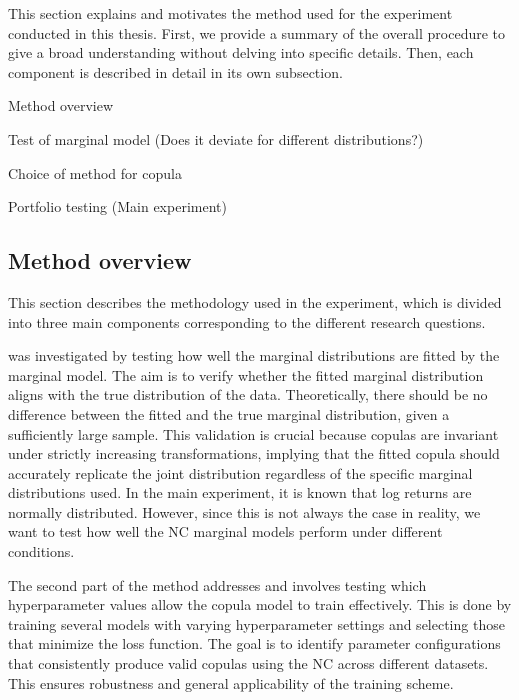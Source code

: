 This section explains and motivates the method used for the experiment conducted in this thesis. First, we provide a summary of the overall procedure to give a broad understanding without delving into specific details. Then, each component is described in detail in its own subsection.

\begin{generalinstructions}
\begin{compactenum}
\item Method overview
\item Test of marginal model (Does it deviate for different distributions?)
\item Choice of method for copula
\item Portfolio testing (Main experiment)
\end{compactenum}
\end{generalinstructions}

\subsection{Method overview}
This section describes the methodology used in the experiment, which is divided into three main components corresponding to the different research questions.

\RQone was investigated by testing how well the marginal distributions are fitted by the marginal model. The aim is to verify whether the fitted marginal distribution aligns with the true distribution of the data. Theoretically, there should be no difference between the fitted and the true marginal distribution, given a sufficiently large sample. This validation is crucial because copulas are invariant under strictly increasing transformations, implying that the fitted copula should accurately replicate the joint distribution regardless of the specific marginal distributions used. In the main experiment, it is known that log returns are normally distributed. However, since this is not always the case in reality, we want to test how well the \gls{NC} marginal models perform under different conditions.

The second part of the method addresses \RQtwo and involves testing which hyperparameter values allow the copula model to train effectively. This is done by training several models with varying hyperparameter settings and selecting those that minimize the loss function. The goal is to identify parameter configurations that consistently produce valid copulas using the \gls{NC} across different datasets. This ensures robustness and general applicability of the training scheme.

